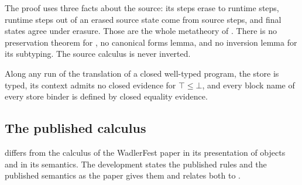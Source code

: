 The proof uses three facts about the source: its steps erase to runtime steps, runtime steps out of an erased source state come from source steps, and final states agree under erasure. Those are the whole metatheory of \DOTMNF. There is no preservation theorem for \DOTMNF, no canonical forms lemma, and no inversion lemma for its subtyping. The source calculus is never inverted.

\begin{corollary}
Along any run of the translation of a closed well-typed program, the store is typed, its context admits no closed evidence for $\top \le \bot$, and every block name of every store binder is defined by closed equality evidence.
\end{corollary}

\subsection{The published calculus}

\DOTMNF differs from the calculus of the WadlerFest paper in its presentation of objects and in its semantics. The development states the published rules and the published semantics as the paper gives them and relates both to \DOTMNF.

